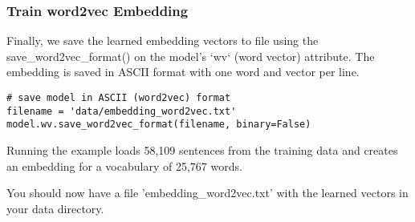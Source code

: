 \begin{frame}[fragile]\frametitle{Train word2vec Embedding}
Finally, we save the learned embedding vectors to file using the save\_word2vec\_format() on the model’s ‘wv‘ (word vector) attribute. The embedding is saved in ASCII format with one word and vector per line.
\begin{lstlisting}
# save model in ASCII (word2vec) format
filename = 'data/embedding_word2vec.txt'
model.wv.save_word2vec_format(filename, binary=False)

\end{lstlisting}
Running the example loads 58,109 sentences from the training data and creates an embedding for a vocabulary of 25,767 words.

You should now have a file ’embedding\_word2vec.txt’ with the learned vectors in your data directory.
\end{frame}

